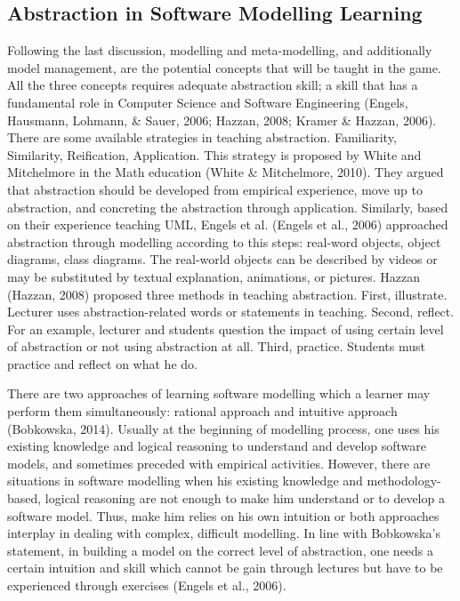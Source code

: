 \documentclass[12pt, a4paper]{report}
\begin{document}
\subsection{Abstraction in Software Modelling Learning}
Following the last discussion, modelling and meta-modelling, and additionally model management, are the potential concepts that will be taught in the game. All the three concepts requires adequate abstraction skill; a skill that has a fundamental role in Computer Science and Software Engineering (Engels, Hausmann, Lohmann, \& Sauer, 2006; Hazzan, 2008; Kramer \& Hazzan, 2006). 
There are some available strategies in teaching abstraction. Familiarity, Similarity, Reification, Application. This strategy is proposed by White and Mitchelmore in the Math education (White \& Mitchelmore, 2010). They argued that abstraction should be developed from empirical experience, move up to abstraction, and concreting the abstraction through application. Similarly, based on their experience teaching UML, Engels et al. (Engels et al., 2006) approached abstraction through modelling according to this steps: real-word objects, object diagrams, class diagrams. The real-world objects can be described by videos or may be substituted by textual explanation, animations, or pictures. Hazzan (Hazzan, 2008) proposed three methods in teaching abstraction. First, illustrate. Lecturer uses abstraction-related words or statements in teaching. Second, reflect. For an example, lecturer and students question the impact of using certain level of abstraction or not using abstraction at all. Third, practice. Students must practice and reflect on what he do.

There are two approaches of learning software modelling which a learner may perform them simultaneously: rational approach and intuitive approach (Bobkowska, 2014). Usually at the beginning of modelling process, one uses his existing knowledge and logical reasoning to understand and develop software models, and sometimes preceded with empirical activities. However, there are situations in software modelling when his existing knowledge and methodology-based, logical reasoning are not enough to make him understand or to develop a software model. Thus, make him relies on his own intuition or both approaches interplay in dealing with complex, difficult modelling. In line with Bobkowska's statement, in building a model on the correct level of abstraction, one needs a certain intuition and skill which cannot be gain through lectures but have to be experienced through exercises (Engels et al., 2006).
\end{document}
